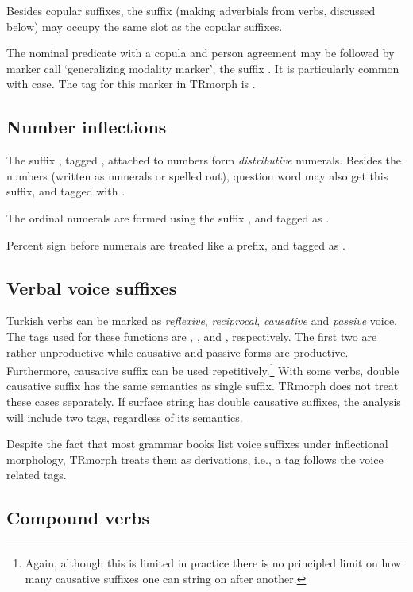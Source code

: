 \documentclass[twocolumn]{article}
\begin{document}
Besides copular suffixes, the suffix  (making adverbials
from verbs, discussed below) may occupy the same slot as the copular
suffixes.

The nominal predicate with a copula and person agreement may be
followed by marker \cite{goksel2005} call `generalizing modality
marker', the suffix . It is particularly common with
 case. The tag for this marker in TRmorph is
.

\subsection{Number inflections}

The suffix , tagged , attached to numbers
form \emph{distributive} numerals. Besides the numbers (written as
numerals or spelled out), question word  may also
get this suffix, and tagged with .

The ordinal numerals are formed using the suffix , and
tagged as .

Percent sign before numerals are treated like a prefix, and tagged as
.

\subsection{Verbal voice suffixes}

Turkish verbs can be marked as \emph{reflexive}, \emph{reciprocal},
\emph{causative} and \emph{passive} voice. The tags used for these
functions are 
,
,
 and
, respectively. The first two are rather unproductive
while causative and passive forms are productive. Furthermore,
causative suffix can be used repetitively.\footnote{Again, although this is
limited in practice there is no principled limit on how many causative
suffixes one can string on after another.} With some verbs, double
causative suffix has the same semantics as single suffix. TRmorph does
not treat these cases separately. If surface string has double
causative suffixes, the analysis will include two  tags,
regardless of its semantics.

Despite the fact that most grammar books list voice suffixes under
inflectional morphology, TRmorph treats them as derivations, i.e., a
 tag follows the voice related tags.

\subsection{Compound verbs}
\end{document}
